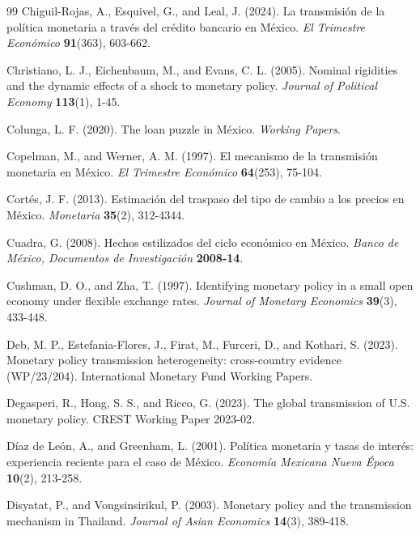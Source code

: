 \documentclass[12pt, reqno]{article}
\begin{document}
\begin{thebibliography}{99}
\bibitem{} \hypertarget{Chiguil-Rojas et al. (2024)}{} 
Chiguil-Rojas, A., Esquivel, G., and Leal, J. (2024). La transmisión de la política monetaria a través del crédito bancario en México. \textit{El Trimestre Económico} \textbf{91}(363), 603-662.

\bibitem{} \hypertarget{Christiano et al. (2005)}{}Christiano, L. J., Eichenbaum, M., and Evans, C. L. (2005). Nominal rigidities and the dynamic effects of a shock to monetary policy. \textit{Journal of Political Economy} \textbf{113}(1), 1-45.

\bibitem{} \hypertarget{Colunga (2020)}{} 
Colunga, L. F. (2020). The loan puzzle in México. \textit{Working Papers}.

\bibitem{} \hypertarget{Copelman and Werner (1997)}{} 
Copelman, M., and Werner, A. M. (1997). El mecanismo de la transmisión monetaria en México. \textit{El Trimestre Económico} \textbf{64}(253), 75-104.

\bibitem{} \hypertarget{Cortés (2013)}{}Cortés, J. F. (2013). Estimación del traspaso del tipo de cambio a los precios en México. \textit{Monetaria} \textbf{35}(2), 312-4344.

\bibitem{} \hypertarget{Cuadra (2008)}{}Cuadra, G. (2008). Hechos estilizados del ciclo económico en México. \textit{Banco de México, Documentos de Investigación} \textbf{2008-14}.

\bibitem{} \hypertarget{Cushman and Zha (1997)}{}Cushman, D. O., and Zha, T. (1997). Identifying monetary policy in a small open economy under flexible exchange rates. \textit{Journal of Monetary Economics} \textbf{39}(3), 433-448.

\bibitem{} \hypertarget{Deb et al. (2023)}{}Deb, M. P., Estefania-Flores, J., Firat, M., Furceri, D., and Kothari, S. (2023). Monetary policy transmission heterogeneity: cross-country evidence (WP/23/204). International Monetary Fund Working Papers.

\bibitem{} \hypertarget{Degasperi et al. (2023)}{}
Degasperi, R., Hong, S. S., and Ricco, G. (2023). The global transmission of U.S. monetary policy. CREST Working Paper 2023-02.

\bibitem{} \hypertarget{Diaz de Leon and Greenham (2001)}{} 
Díaz de León, A., and Greenham, L. (2001). Política monetaria y tasas de interés: experiencia reciente para el caso de México. \textit{Economía Mexicana Nueva Época} \textbf{10}(2), 213-258.

\bibitem{} \hypertarget{Disyatat and Vongsinsirikul (2003)}{}Disyatat, P., and Vongsinsirikul, P. (2003). Monetary policy and the transmission mechanism in Thailand. \textit{Journal of Asian Economics} \textbf{14}(3), 389-418.


\end{thebibliography}
\end{document}
